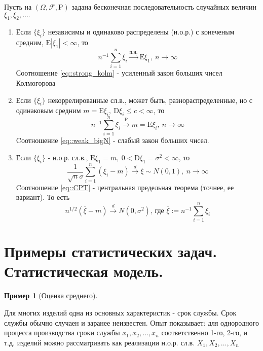 \documentclass[12pt]{article}
\newtheorem*{example}{Пример}
\theoremstyle{basic_theorem}
\theoremstyle{name_theorem}
\def\E{
    \mathrm{E}
}
\def\D{
    \mathrm{D}
}
\def\P{
    \mathrm{P}
}
\def\F{
    \mathcal{F}
}
\begin{document}
    Пусть на $(\Omega, \F, \P)$ задана бесконечная последовательность
    случайных величин $\xi_1, \xi_2, \ldots.$
    \begin{enumerate}
        \item Если $\{\xi_i\}$ независимы и одинаково распределены (н.о.р.)
        с конеченым средним, $\E|\xi_1|<\infty$, то
        \begin{equation} \label{eq::strong_kolm}
            n^{-1}\sum_{i=1}^n\xi_i\xrightarrow{\text{п.н.}}\E\xi_1,\ n\rightarrow\infty
        \end{equation}
        Соотношение \eqref{eq::strong_kolm} - усиленный закон больших чисел Колмогорова
        \item Если $\{\xi_i\}$ некоррелированные сл.в., может быть, разнораспределенные, но с
        одинаковым средним $m = \E\xi_i,\ \D\xi_i\leq c <\infty$, то
        \begin{equation} \label{eq::weak_bigN}
            n^{-1}\sum^n_{i=1}\xi_i\xrightarrow{\P}m=\E\xi_i,\ n\rightarrow\infty
        \end{equation}
        Cоотношение \eqref{eq::weak_bigN} - слабый закон больших чисел.
        \item Если $\{\xi_i\}$ - н.о.р. сл.в., $\E\xi_1=m,\ 0<\D\xi_1=\sigma^2<\infty$,
        то
        \begin{equation} \label{eq::CPT}
            \frac{1}{\sqrt{n}\sigma}\sum_{i=1}^n(\xi_i-m)\xrightarrow{d}\xi\sim N(0,1),\ n\rightarrow\infty
        \end{equation}
        Cоотношение \eqref{eq::CPT} - центральная предельная теорема (точнее, ее вариант).
        То есть $$n^{1/2}(\overline{\xi}-m)\xrightarrow{d}N(0,\sigma^2)\text{, где } \overline{\xi}:=n^{-1}\sum_{i=1}^n\xi_i$$
    \end{enumerate}

\section{Примеры статистических задач. \\ Статистическая модель.}

\begin{example}[Оценка среднего]
\end{example}
    Для многих изделий одна из основных характеристик - срок службы.
    Срок службы обычно случаен и заранее неизвестен. Опыт показывает:
    для однородного процесса производства сроки службы $x_1, x_2, \ldots, x_n$
    соответственно 1-го, 2-го, и т.д. изделий можно рассматривать как
    реализации н.о.р. сл.в. $X_1, X_2, \ldots, X_n$
\end{document}
